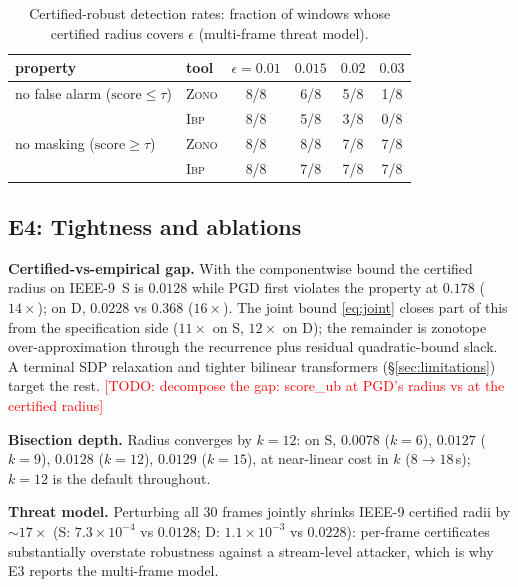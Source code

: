 \documentclass{article} %
\newcommand{\todo}[1]{\textcolor{red}{[TODO: #1]}}
\newcommand{\score}{\mathrm{score}}
\begin{document}
\begin{table}[h]
\caption{Certified-robust detection rates: fraction of windows whose
certified radius covers $\epsilon$ (multi-frame threat model).}
\label{tab:e3}
\begin{center}
\small
\begin{tabular}{llcccc}
\toprule
property & tool & $\epsilon{=}0.01$ & $0.015$ & $0.02$ & $0.03$ \\
\midrule
no false alarm ($\score \le \tau$) & \textsc{Zono} & 8/8 & 6/8 & 5/8 & 1/8 \\
 & \textsc{Ibp} & 8/8 & 5/8 & 3/8 & 0/8 \\
no masking ($\score \ge \tau$) & \textsc{Zono} & 8/8 & 8/8 & 7/8 & 7/8 \\
 & \textsc{Ibp} & 8/8 & 7/8 & 7/8 & 7/8 \\
\bottomrule
\end{tabular}
\end{center}
\end{table}

\subsection{E4: Tightness and ablations}
\label{sec:e4}

\textbf{Certified-vs-empirical gap.} With the componentwise bound the
certified radius on IEEE-9~S is $0.0128$ while PGD first violates the
property at $0.178$ ($14\times$); on D, $0.0228$ vs $0.368$
($16\times$). The joint bound \eqref{eq:joint} closes part of this
from the specification side ($11\times$ on S, $12\times$ on D); the
remainder is zonotope over-approximation through the recurrence plus
residual quadratic-bound slack. A terminal SDP relaxation and
tighter bilinear transformers (\S\ref{sec:limitations}) target the
rest. \todo{decompose the gap: score\_ub at PGD's radius vs at the
certified radius}

\textbf{Bisection depth.} Radius converges by $k{=}12$: on S,
$0.0078$ ($k{=}6$), $0.0127$ ($k{=}9$), $0.0128$ ($k{=}12$), $0.0129$
($k{=}15$), at near-linear cost in $k$ ($8 \to 18$\,s); $k{=}12$ is
the default throughout.

\textbf{Threat model.} Perturbing all 30 frames jointly shrinks
IEEE-9 certified radii by $\sim\!17\times$ (S: $7.3\times10^{-4}$ vs
$0.0128$; D: $1.1\times10^{-3}$ vs $0.0228$): per-frame certificates
substantially overstate robustness against a stream-level attacker,
which is why E3 reports the multi-frame model.
\end{document}
